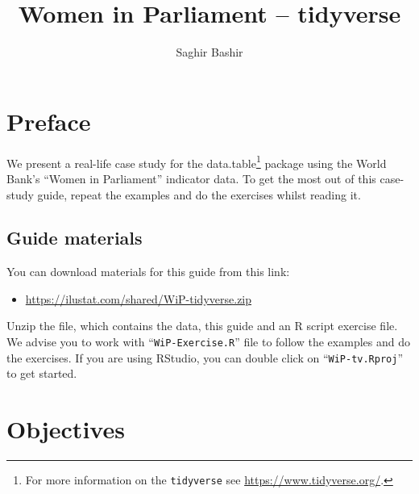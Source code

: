\documentclass[a4paper,9pt,twocolumn,twoside,printwatermark=false]{pinp}
\title{Women in Parliament -- tidyverse}
\author[]{Saghir Bashir}
\providecommand{\tightlist}{%
  \setlength{\itemsep}{0pt}\setlength{\parskip}{0pt}}
\begin{document}
\verticaladjustment{-2pt}

\maketitle
\thispagestyle{firststyle}



\section{Preface}\label{preface}

We present a real-life case study for the data.table\footnote{For more
  information on the \texttt{tidyverse} see
  \url{https://www.tidyverse.org/}.} package using the World Bank's
``Women in Parliament'' indicator data. To get the most out of this
case-study guide, repeat the examples and do the exercises whilst
reading it.

\subsection{Guide materials}\label{guide-materials}

You can download materials for this guide from this link:

\begin{itemize}
\tightlist
\item
  \url{https://ilustat.com/shared/WiP-tidyverse.zip}
\end{itemize}

Unzip the file, which contains the data, this guide and an R script
exercise file. We advise you to work with ``\texttt{WiP-Exercise.R}''
file to follow the examples and do the exercises. If you are using
RStudio, you can double click on ``\texttt{WiP-tv.Rproj}'' to get
started.

\section{Objectives}\label{objectives}
\end{document}
